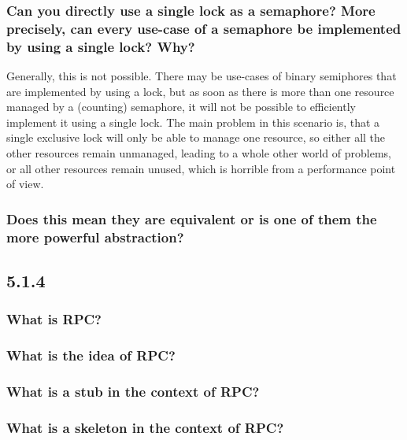 \documentclass[12pt, a4paper]{article}
\begin{document}
\subsubsection*{Can you directly use a single lock as a semaphore? More precisely, can every use-case of 
a semaphore be implemented by using a single lock? Why?}
Generally, this is not possible. There may be use-cases of binary semiphores that are implemented by using a 
lock, but as soon as there is more than one resource managed by a (counting) semaphore, it will not be 
possible to efficiently implement it using a single lock. The main problem in this scenario is, that a single 
exclusive lock will only be able to manage one resource, so either all the other resources remain unmanaged, 
leading to a whole other world of problems, or all other resources remain unused, which is horrible from 
a performance point of view.

\subsubsection*{Does this mean they are equivalent or is one of them the more powerful abstraction?}

\subsection*{5.1.4}
\subsubsection*{What is RPC?}
\subsubsection*{What is the idea of RPC?}
\subsubsection*{What is a stub in the context of RPC?}
\subsubsection*{What is a skeleton in the context of RPC?}
\end{document}
